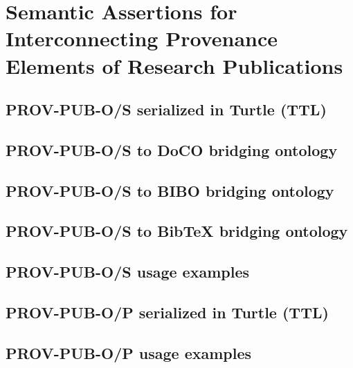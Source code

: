 \chapter{Semantic Assertions for Interconnecting Provenance Elements of Research Publications}
\label{ch:ontologies}
\section{PROV-PUB-O/S serialized in Turtle (TTL)}

\section{PROV-PUB-O/S to DoCO bridging ontology}

\section{PROV-PUB-O/S to BIBO bridging ontology}

\section{PROV-PUB-O/S to BibTeX bridging ontology}

\section{PROV-PUB-O/S usage examples}

\section{PROV-PUB-O/P serialized in Turtle (TTL)}

\section{PROV-PUB-O/P usage examples}


